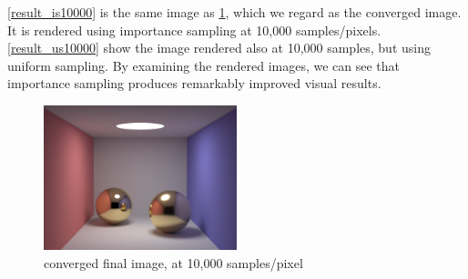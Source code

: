 \documentclass[12pt]{article}
\begin{document}
\cref{result_is10000} is the same image as \ref{result_converged}, which we regard as the converged image.
It is rendered using importance sampling at 10,000 samples/pixels.
\cref{result_us10000} show the image rendered also at 10,000 samples, but using uniform sampling.
By examining the rendered images, we can see that importance sampling produces remarkably improved visual results.

\begin{figure}[ht]
  \centering
  \includegraphics[width=0.5\textwidth]{convergedIS.png}
  \caption{converged final image, at 10,000 samples/pixel}
  \label{result_converged}
\end{figure}
\end{document}
